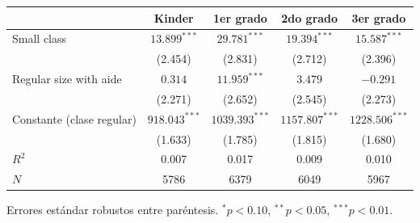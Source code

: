 
\begin{tabular}{lcccc}
\toprule
 & Kinder & 1er grado & 2do grado & 3er grado\\
\midrule
Small class & $13.899^{***}$ & $29.781^{***}$ & $19.394^{***}$ & $15.587^{***}$\\
 & (2.454) & (2.831) & (2.712) & (2.396)\\
Regular size with aide & $0.314$ & $11.959^{***}$ & $3.479$ & $-0.291$\\
 & (2.271) & (2.652) & (2.545) & (2.273)\\
Constante (clase regular) & $918.043^{***}$ & $1039.393^{***}$ & $1157.807^{***}$ & $1228.506^{***}$\\
 & (1.633) & (1.785) & (1.815) & (1.680)\\
$R^2$ & 0.007 & 0.017 & 0.009 & 0.010\\
$N$ & 5786 & 6379 & 6049 & 5967\\
\bottomrule
\end{tabular}
\par\vspace{3pt}
{\footnotesize\parbox{0.9\linewidth}{\centering Errores est\'andar robustos entre par\'entesis. $^{*}p<0.10$, $^{**}p<0.05$, $^{***}p<0.01$.}}
